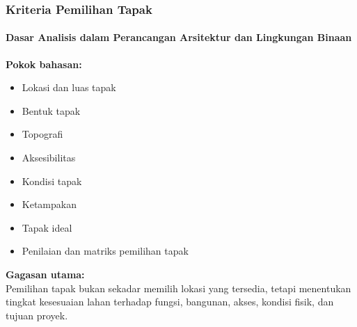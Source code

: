 \documentclass[../main.tex]{subfiles}
\begin{document}
\begin{frame}[mytitle=center, c, mycolor=digiPH_ocean, dark]
	\frametitle{Kriteria Pemilihan Tapak}
	\framesubtitle{Dasar Analisis dalam Perancangan Arsitektur dan Lingkungan Binaan}

	\textbf{Pokok bahasan:}
	\begin{itemize}
		\item Lokasi dan luas tapak
		\item Bentuk tapak
		\item Topografi
		\item Aksesibilitas
		\item Kondisi tapak
		\item Ketampakan
		\item Tapak ideal
		\item Penilaian dan matriks pemilihan tapak
	\end{itemize}

	\vspace{0.5cm}
	\textbf{Gagasan utama:}\\
	Pemilihan tapak bukan sekadar memilih lokasi yang tersedia, tetapi menentukan tingkat kesesuaian lahan terhadap fungsi, bangunan, akses, kondisi fisik, dan tujuan proyek.
\end{frame}
\end{document}
